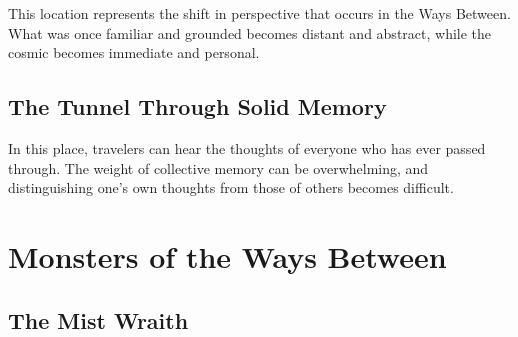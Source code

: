 \documentclass[11pt]{article}
\begin{document}
This location represents the shift in perspective that occurs in the Ways Between. What was once familiar and grounded becomes distant and abstract, while the cosmic becomes immediate and personal.

\subsection{The Tunnel Through Solid Memory}

In this place, travelers can hear the thoughts of everyone who has ever passed through. The weight of collective memory can be overwhelming, and distinguishing one's own thoughts from those of others becomes difficult.

\section{Monsters of the Ways Between}

\subsection{The Mist Wraith}
\end{document}
